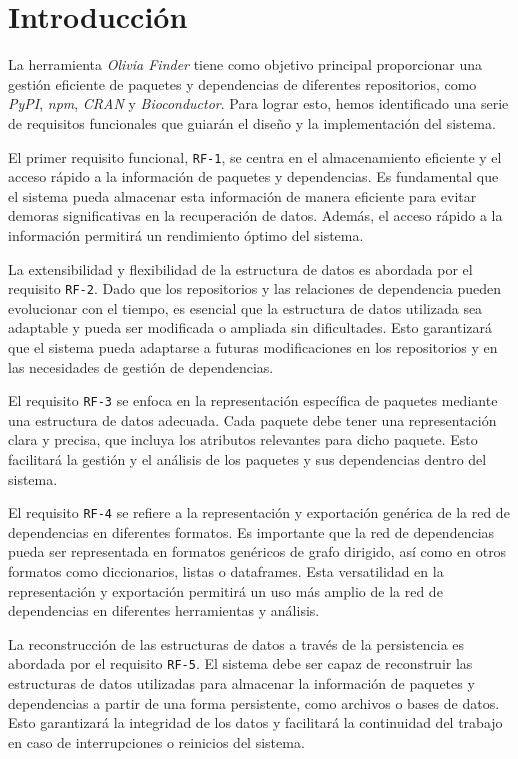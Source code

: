 
\section{Introducción}
La herramienta \textit{Olivia Finder} tiene como objetivo principal proporcionar
una gestión eficiente de paquetes y dependencias de diferentes repositorios, como
\textit{PyPI}, \textit{npm}, \textit{CRAN} y \textit{Bioconductor}. Para lograr esto,
hemos identificado una serie de requisitos funcionales que guiarán el diseño y la
implementación del sistema.

El primer requisito funcional, \texttt{RF-1}, se centra en el almacenamiento eficiente
y el acceso rápido a la información de paquetes y dependencias. Es fundamental que el
sistema pueda almacenar esta información de manera eficiente para evitar demoras
significativas en la recuperación de datos. Además, el acceso rápido a la información
permitirá un rendimiento óptimo del sistema.

La extensibilidad y flexibilidad de la estructura de datos es abordada por el
requisito \texttt{RF-2}. Dado que los repositorios y las relaciones de dependencia
pueden evolucionar con el tiempo, es esencial que la estructura de datos utilizada sea
adaptable y pueda ser modificada o ampliada sin dificultades. Esto garantizará que el
sistema pueda adaptarse a futuras modificaciones en los repositorios y en las necesidades
de gestión de dependencias.

El requisito \texttt{RF-3} se enfoca en la representación específica de paquetes mediante
una estructura de datos adecuada. Cada paquete debe tener una representación clara y
precisa, que incluya los atributos relevantes para dicho paquete. Esto facilitará la
gestión y el análisis de los paquetes y sus dependencias dentro del sistema.

El requisito \texttt{RF-4} se refiere a la representación y exportación genérica de la
red de dependencias en diferentes formatos. Es importante que la red de dependencias
pueda ser representada en formatos genéricos de grafo dirigido, así como en otros formatos
como diccionarios, listas o dataframes. Esta versatilidad en la representación y exportación
permitirá un uso más amplio de la red de dependencias en diferentes herramientas y análisis.

La reconstrucción de las estructuras de datos a través de la persistencia es abordada por
el requisito \texttt{RF-5}. El sistema debe ser capaz de reconstruir las estructuras de
datos utilizadas para almacenar la información de paquetes y dependencias a partir de una
forma persistente, como archivos o bases de datos. Esto garantizará la integridad de
los datos y facilitará la continuidad del trabajo en caso de interrupciones o reinicios del sistema.

